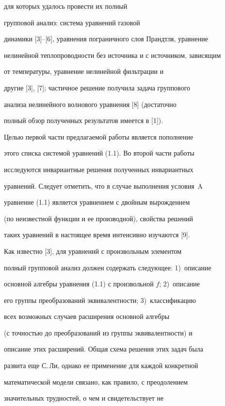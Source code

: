 для которых удалось провести их полный 


групповой анализ: система уравнений газовой 


динамики [3]--[6], уравнения пограничного слоя Прандтля, уравнение 


нелинейной теплопроводности без источника и с источником, зависящим 


от температуры, уравнение нелинейной фильтрации и 


другие [3], [7]; частичное решение получила задача группового 


анализа нелинейного волнового уравнения [8] (достаточно 


полный обзор полученных результатов имеется в [1]). 


Целью первой части предлагаемой работы является пополнение 


этого списка системой уравнений (1.1). Во второй части работы 


исследуются инвариантные решения полученных инвариантных 


уравнений. Следует отметить, что в случае выполнения условия~A 


уравнение (1.1) является уравнением с двойным вырождением 


(по неизвестной функции и ее производной), свойства решений 


таких уравнений в настоящее время интенсивно изучаются [9]. 


 


Как известно [3], для уравнений с произвольным элементом 


полный групповой анализ должен содержать следующее: 1)~описание 


основной алгебры уравнения (1.1) с произвольной $f$; 2)~описание 


его группы преобразований эквивалентности; 3)~классификацию 


всех возможных случаев расширения основной алгебры 


(с точностью до преобразований из группы эквивалентности) и 


описание этих расширений. Общая схема решения этих задач была 


развита еще С.\,Ли, однако ее применение для каждой конкретной 


математической модели связано, как правило, с преодолением 


значительных трудностей, о чем и свидетельствует не 


